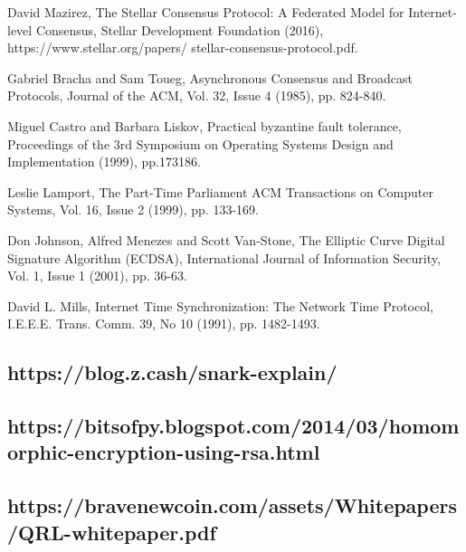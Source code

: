 \documentclass[11pt]{article}
\begin{document}
David Mazirez, The Stellar Consensus Protocol: A Federated Model for Internet- level Consensus, Stellar Development Foundation (2016), https://www.stellar.org/papers/ stellar-consensus-protocol.pdf.


Gabriel Bracha and Sam Toueg, Asynchronous Consensus and Broadcast Protocols, Journal of the ACM, Vol. 32, Issue 4 (1985), pp. 824-840.


Miguel Castro and Barbara Liskov, Practical byzantine fault tolerance, Proceedings of the 3rd Symposium on Operating Systems Design and Implementation (1999), pp.173186.


Leslie Lamport, The Part-Time Parliament ACM Transactions on Computer Systems, Vol. 16, Issue 2 (1999), pp. 133-169.


Don Johnson, Alfred Menezes and Scott Van-Stone, The Elliptic Curve Digital Signature Algorithm (ECDSA), International Journal of Information Security, Vol. 1, Issue 1 (2001), pp. 36-63.


David L. Mills, Internet Time Synchronization: The Network Time Protocol, I.E.E.E. Trans. Comm. 39, No 10 (1991), pp. 1482-1493.


\subsection{https://blog.z.cash/snark-explain/}

\subsection{https://bitsofpy.blogspot.com/2014/03/homomorphic-encryption-using-rsa.html}

\subsection{https://bravenewcoin.com/assets/Whitepapers/QRL-whitepaper.pdf}
\end{document}
